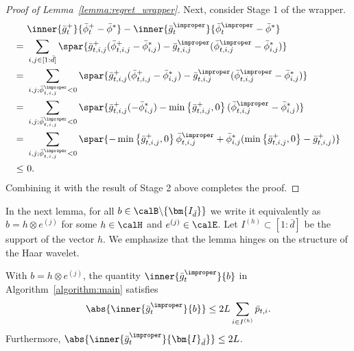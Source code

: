 \documentclass[10pt]{article}
\begin{document}
\begin{proof}[Proof of Lemma~\ref{lemma:regret_wrapper}]
Next, consider Stage 1 of the wrapper.
\begin{align*}
&\inner{\bar g^+_t}{\bar \phi^+_t-\bar \phi^*}-\inner{\bar g_t^\improper}{\bar \phi_t^\improper-\bar \phi^*}\\
=~&\sum_{i,j\in[1:\bar d]}\spar{\bar g^+_{t,i,j}(\bar \phi^+_{t,i,j}-\bar \phi^*_{i,j})-\bar g^\improper_{t,i,j}(\bar \phi^\improper_{t,i,j}-\bar \phi^*_{i,j})}\\
=~&\sum_{i,j; \bar \phi^\improper_{t,i,j}<0}\spar{\bar g^+_{t,i,j}(\bar \phi^+_{t,i,j}-\bar \phi^*_{i,j})-\bar g^\improper_{t,i,j}(\bar \phi^\improper_{t,i,j}-\bar \phi^*_{i,j})}\\
=~&\sum_{i,j; \bar \phi^\improper_{t,i,j}<0}\spar{\bar g^+_{t,i,j}(-\bar \phi^*_{i,j})-\min\left\{\bar g^+_{t,i,j},0\right\}(\bar \phi^\improper_{t,i,j}-\bar \phi^*_{i,j})}\\
=~&\sum_{i,j; \bar \phi^\improper_{t,i,j}<0}\spar{-\min\left\{\bar g^+_{t,i,j},0\right\}\bar \phi^\improper_{t,i,j}+\bar \phi^*_{i,j}(\min\left\{\bar g^+_{t,i,j},0\right\}-\bar g^+_{t,i,j})}\\
\leq~& 0.
\end{align*}
Combining it with the result of Stage 2 above completes the proof.
\end{proof}

In the next lemma, for all $b\in \calB\backslash\{\bm{I_{\bar d}}\}$ we write it equivalently as $b=h\otimes e^{(j)}$ for some $h\in\calH$ and $e^{(j)}\in\calE$. Let $I^{(h)}\subset[1:\bar d]$ be the support of the vector $h$. We emphasize that the lemma hinges on the structure of the Haar wavelet. 

\begin{lemma}\label{lemma:gradient_norm}
With $b=h\otimes e^{(j)}$, the quantity $\inner{\bar g_t^\improper}{b}$ in Algorithm~\ref{algorithm:main} satisfies
\begin{equation*}
\abs{\inner{\bar g_t^\improper}{b}}\leq 2L\sum_{i\in I^{(h)}}\bar p_{t,i}.
\end{equation*}
Furthermore, $\abs{\inner{\bar g_t^\improper}{\bm{I}_{\bar d}}}\leq 2L$.
\end{lemma}
\end{document}
